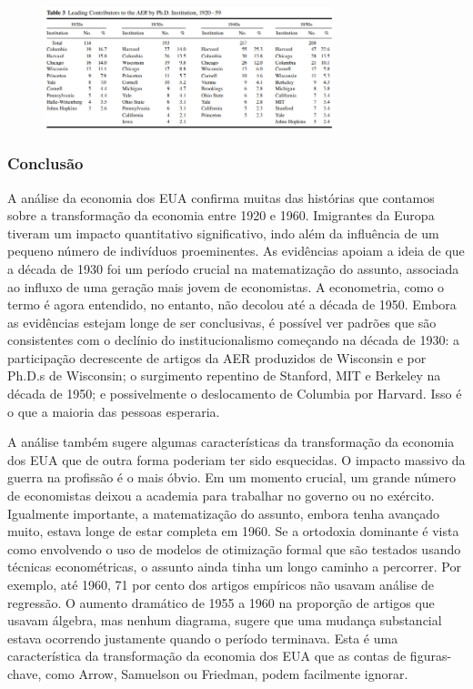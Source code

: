 \documentclass[12pt]{article}
\begin{document}
\begin{figure}[H]
    \centering
    \includegraphics[width=0.75\textwidth]{4º Período/História do Pensamento Econômico/Tradução HPE/Tradução Tópico 7.2/table 3.png}
    \end{figure}

\subsubsection{\textbf{Conclusão}}
A análise da economia dos EUA confirma muitas das histórias que contamos sobre a transformação da economia entre 1920 e 1960. Imigrantes da Europa tiveram um impacto quantitativo significativo, indo além da influência de um pequeno número de indivíduos proeminentes. As evidências apoiam a ideia de que a década de 1930 foi um período crucial na matematização do assunto, associada ao influxo de uma geração mais jovem de economistas. A econometria, como o termo é agora entendido, no entanto, não decolou até a década de 1950. Embora as evidências estejam longe de ser conclusivas, é possível ver padrões que são consistentes com o declínio do institucionalismo começando na década de 1930: a participação decrescente de artigos da AER produzidos de Wisconsin e por Ph.D.s de Wisconsin; o surgimento repentino de Stanford, MIT e Berkeley na década de 1950; e possivelmente o deslocamento de Columbia por Harvard. Isso é o que a maioria das pessoas esperaria.

A análise também sugere algumas características da transformação da economia dos EUA que de outra forma poderiam ter sido esquecidas. O impacto massivo da guerra na profissão é o mais óbvio. Em um momento crucial, um grande número de economistas deixou a academia para trabalhar no governo ou no exército. Igualmente importante, a matematização do assunto, embora tenha avançado muito, estava longe de estar completa em 1960. Se a ortodoxia dominante é vista como envolvendo o uso de modelos de otimização formal que são testados usando técnicas econométricas, o assunto ainda tinha um longo caminho a percorrer. Por exemplo, até 1960, 71 por cento dos artigos empíricos não usavam análise de regressão. O aumento dramático de 1955 a 1960 na proporção de artigos que usavam álgebra, mas nenhum diagrama, sugere que uma mudança substancial estava ocorrendo justamente quando o período terminava. Esta é uma característica da transformação da economia dos EUA que as contas de figuras-chave, como Arrow, Samuelson ou Friedman, podem facilmente ignorar.
\end{document}
